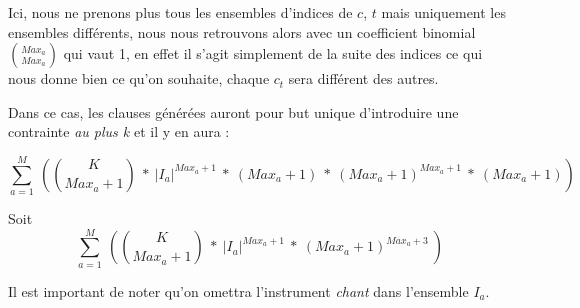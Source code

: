 \documentclass[11pt]{article}
\begin{document}
Ici, nous ne prenons plus tous les ensembles d'indices de $c$, $t$ mais uniquement les ensembles différents, nous nous retrouvons alors avec un coefficient binomial ${Max_a \choose Max_a}$ qui vaut 1, en effet il s'agit simplement de la suite des indices ce qui nous donne bien ce qu'on souhaite, chaque $c_t$ sera différent des autres.

\label{addendum}

Dans ce cas, les clauses générées auront pour but unique d'introduire une contrainte \textsl{au plus k} et il y en aura :

$$\sum_{a=1}^{M}\ \left( {K \choose Max_a+1}\ * \ |I_a|^{Max_a+1}\ *\ \left(Max_a+1\right)\ *\ \left(Max_a+1\right)^{Max_a+1}\ *\  \left(Max_a+1\right) \right) $$

Soit\\

$$\sum_{a=1}^{M}\ \left( {K \choose Max_a+1}\ * \ |I_a|^{Max_a+1}\ *\ \left(Max_a+1\right)^{Max_a+3}\ \right) $$

Il est important de noter qu'on omettra l'instrument \textsl{chant} dans l'ensemble $I_a$.
\end{document}
